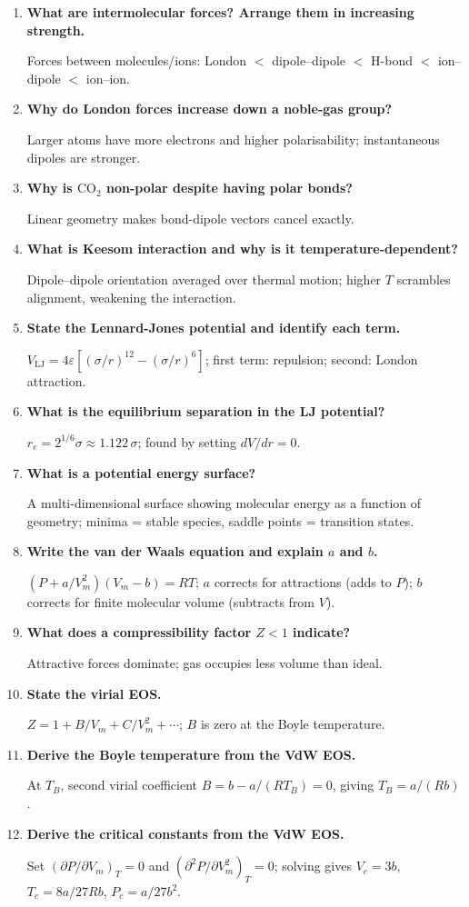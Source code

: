 \documentclass[12pt,a4paper]{article}
\newcommand{\Q}[1]{\textbf{#1}\par\noindent\ignorespaces}
\begin{document}
\begin{tcolorbox}[exambox, title={Frequently Asked / Viva Questions}]
\begin{enumerate}[topsep=0pt, label=\textbf{Q\arabic*.}, itemsep=5pt]
  \item \Q{What are intermolecular forces? Arrange them in increasing strength.}
    Forces between molecules/ions: London $<$ dipole--dipole $<$ H-bond $<$ ion--dipole $<$ ion--ion.
  \item \Q{Why do London forces increase down a noble-gas group?}
    Larger atoms have more electrons and higher polarisability; instantaneous dipoles are stronger.
  \item \Q{Why is $\mathrm{CO_2}$ non-polar despite having polar bonds?}
    Linear geometry makes bond-dipole vectors cancel exactly.
  \item \Q{What is Keesom interaction and why is it temperature-dependent?}
    Dipole--dipole orientation averaged over thermal motion; higher $T$ scrambles alignment, weakening the interaction.
  \item \Q{State the Lennard-Jones potential and identify each term.}
    $V_{\mathrm{LJ}}=4\varepsilon[(\sigma/r)^{12}-(\sigma/r)^6]$; first term: repulsion; second: London attraction.
  \item \Q{What is the equilibrium separation in the LJ potential?}
    $r_e = 2^{1/6}\sigma \approx 1.122\,\sigma$; found by setting $dV/dr = 0$.
  \item \Q{What is a potential energy surface?}
    A multi-dimensional surface showing molecular energy as a function of geometry; minima = stable species, saddle points = transition states.
  \item \Q{Write the van der Waals equation and explain $a$ and $b$.}
    $(P + a/V_m^2)(V_m - b) = RT$; $a$ corrects for attractions (adds to $P$); $b$ corrects for finite molecular volume (subtracts from $V$).
  \item \Q{What does a compressibility factor $Z < 1$ indicate?}
    Attractive forces dominate; gas occupies less volume than ideal.
  \item \Q{State the virial EOS.}
    $Z = 1 + B/V_m + C/V_m^2 + \cdots$; $B$ is zero at the Boyle temperature.
  \item \Q{Derive the Boyle temperature from the VdW EOS.}
    At $T_B$, second virial coefficient $B = b - a/(RT_B) = 0$, giving $T_B = a/(Rb)$.
  \item \Q{Derive the critical constants from the VdW EOS.}
    Set $(\partial P/\partial V_m)_T = 0$ and $(\partial^2 P/\partial V_m^2)_T = 0$; solving gives $V_c=3b$, $T_c=8a/27Rb$, $P_c=a/27b^2$.

\end{enumerate}
\end{tcolorbox}
\end{document}
